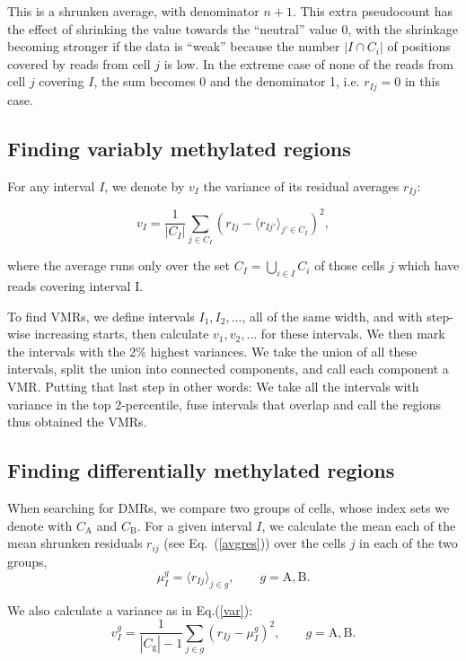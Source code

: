 \documentclass[10pt]{article}
\begin{document}
This is a shrunken average, with denominator $n+1$.
This extra pseudocount has the effect of shrinking the value towards the ``neutral'' value 0, with the shrinkage becoming stronger if the data is ``weak'' because the number $|I\cap C_i|$ of positions covered by reads from cell $j$  is low.
In the extreme case of none of the reads from cell $j$ covering $I$, the sum becomes 0 and the denominator 1, i.e.
$r_{Ij}=0$ in this case.

\subsection*{Finding variably methylated regions}

For any interval $I$, we denote by $v_I$ the variance of its residual averages $r_{Ij}$:

\begin{equation} 
v_I = \frac{1}{|C_I|}\sum_{j\in C_I}\left( r_{Ij} - \langle r_{Ij'}\rangle_{j'\in C_I} \right)^2, \label{var}
\end{equation}

where the average runs only over the set $C_I=\bigcup_{i\in I}C_i$ of those cells $j$ which have reads covering interval I.

To find VMRs, we define intervals $I_1, I_2, ...$, all of the same width, and with step-wise increasing starts, then calculate $v_1, v_2, ...$ for these intervals.
We then mark the intervals with the 2\% highest variances.
We take the union of all these intervals, split the union into connected components, and call each component a VMR.
Putting that last step in other words:
We take all the intervals with variance in the top 2-percentile, fuse intervals that overlap and call the regions thus obtained the VMRs.

\subsection*{Finding differentially methylated regions}

When searching for DMRs, we compare two groups of cells, whose index sets we denote with $C_\text{A}$ and $C_\text{B}$.
For a given interval $I$, we calculate the mean each of the mean shrunken residuals $r_{ij}$ (see Eq.~(\ref{avgres})) over the cells $j$ in each of the two groups,
\[ \mu^g_I = \langle r_{Ij} \rangle_{j\in g},\qquad g=\text{A},\text{B}. \]

We also calculate a variance as in Eq.(\ref{var}):
\[ v^g_I = \frac{1}{|C_\text{g}|-1}  \sum_{j\in g} \left( r_{Ij} - \mu_I^g \right)^2, 
\qquad g=\text{A},\text{B}.\]
\end{document}
